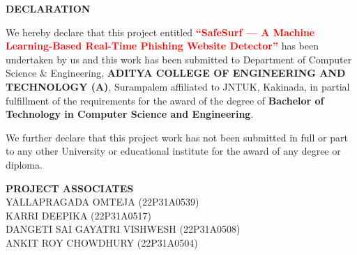 \begin{center}
\textbf{\Large DECLARATION}
\end{center}

\vspace{1cm}

\noindent
We hereby declare that this project entitled
\textbf{\textcolor{red}{``SafeSurf — A Machine Learning-Based Real-Time Phishing Website Detector''}}
has been undertaken by us and this work has been submitted to Department of Computer Science \& Engineering,
\textbf{ADITYA \newline COLLEGE OF ENGINEERING AND TECHNOLOGY (A)}, Surampalem affiliated to JNTUK, Kakinada,
in partial fulfillment of the requirements for the award of the degree of
\textbf{Bachelor of Technology in Computer Science and Engineering}.

\vspace{0.5cm}

\noindent
We further declare that this project work has not been submitted in full or part to any other University
or educational institute for the award of any degree or diploma.

\vspace{2cm}

\begin{flushright}
\textbf{PROJECT ASSOCIATES}\\[0.5cm]

YALLAPRAGADA OMTEJA (22P31A0539)\\
KARRI DEEPIKA (22P31A0517)\\
DANGETI SAI GAYATRI VISHWESH (22P31A0508)\\
ANKIT ROY CHOWDHURY (22P31A0504)
\end{flushright}